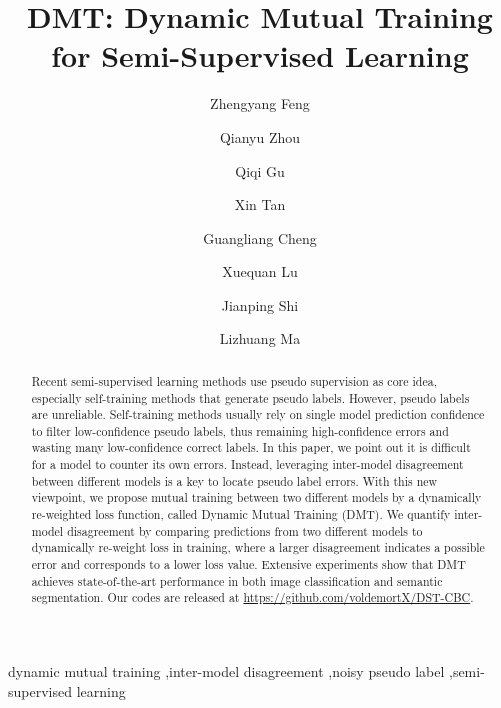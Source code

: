 \documentclass[preprint,review,10pt]{elsarticle}
\begin{document}
\begin{frontmatter}



\title{DMT: Dynamic Mutual Training for Semi-Supervised Learning}

\author[1]{Zhengyang Feng}
\author[1]{Qianyu Zhou}
\author[1]{Qiqi Gu}
\author[1]{Xin Tan}
\author[2]{Guangliang Cheng}
\author[3]{Xuequan Lu}
\author[2]{Jianping Shi}
\author[1]{Lizhuang Ma}
\address[1]{Shanghai Jiao Tong University, Shanghai, China}
\address[2]{SenseTime Research, Shanghai, China}
\address[3]{Deakin University, Australia}
            




\begin{abstract}
Recent semi-supervised learning methods use pseudo supervision as core idea, especially self-training methods that generate pseudo labels. However, pseudo labels are unreliable. Self-training methods usually rely on single model prediction confidence to filter low-confidence pseudo labels, thus remaining high-confidence errors and wasting many low-confidence correct labels. In this paper, we point out it is difficult for a model to counter its own errors. Instead, leveraging inter-model disagreement between different models is a key to locate pseudo label errors. With this new viewpoint, we propose mutual training between two different models by a dynamically re-weighted loss function, called Dynamic Mutual Training (DMT). We quantify inter-model disagreement by comparing predictions from two different models to dynamically re-weight loss in training, where a larger disagreement indicates a possible error and corresponds to a lower loss value. Extensive experiments show that DMT achieves state-of-the-art performance in both image classification and semantic segmentation. Our codes are released at \url{https://github.com/voldemortX/DST-CBC}.

\end{abstract}




\begin{keyword}
dynamic mutual training \sep inter-model disagreement \sep noisy pseudo label \sep semi-supervised learning
\end{keyword}

\end{frontmatter}
\end{document}
